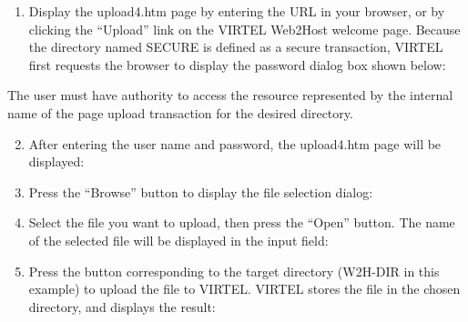 \documentclass[letterpaper,10pt,english]{sphinxmanual}
\begin{document}
\begin{enumerate}
\item {} 
Display the upload4.htm page by entering the URL  in your browser, or by clicking the “Upload” link on the VIRTEL Web2Host welcome page. Because the directory named SECURE is defined as a secure transaction, VIRTEL first requests the browser to display the password dialog box shown below:

\end{enumerate}



The user must have authority to access the resource represented by the internal name of the page upload transaction for the desired directory.
\begin{enumerate}
\setcounter{enumi}{1}
\item {} 
After entering the user name and password, the upload4.htm page will be displayed:

\end{enumerate}


\begin{enumerate}
\setcounter{enumi}{2}
\item {} 
Press the “Browse” button to display the file selection dialog:

\end{enumerate}


\begin{enumerate}
\setcounter{enumi}{3}
\item {} 
Select the file you want to upload, then press the “Open” button. The name of the selected file will be displayed in the input field:

\end{enumerate}


\begin{enumerate}
\setcounter{enumi}{4}
\item {} 
Press the button corresponding to the target directory (W2H-DIR in this example) to upload the file to VIRTEL. VIRTEL stores the file in the chosen directory, and displays the result:

\end{enumerate}
\end{document}
